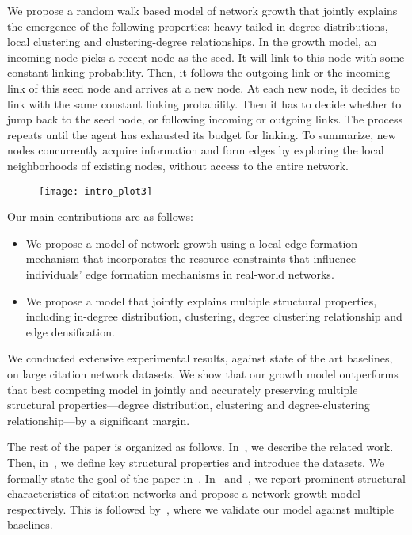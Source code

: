 We propose a random walk based model of network growth that jointly explains the
emergence of the following properties: heavy-tailed in-degree distributions,
local clustering and clustering-degree relationships. In the growth model, an
incoming node picks a recent node as the seed. It will link to this node with
some constant linking probability. Then, it follows the outgoing link or the
incoming link of this seed node and arrives at a new node. At each new node, it
decides to link with the same constant linking probability. Then it has to
decide whether to jump back to the seed node, or following incoming or outgoing
links. The process repeats until the agent has exhausted its budget for linking.
To summarize, new nodes concurrently acquire information and form edges
by exploring the local neighborhoods of existing nodes, without access to the
entire network.

\begin{figure}[t]
 \centering
 \texttt{[image: intro\_plot3]}
 \caption{
 }
 \label{fig:intro_plot}
\end{figure}


Our main contributions are as follows:
\begin{itemize}
    \item We propose a model
    of network growth using a local edge formation mechanism that incorporates the
    resource constraints that influence individuals' edge formation mechanisms in
    real-world networks.
    \item We propose a model that jointly explains multiple
    structural properties, including in-degree distribution, clustering, degree
    clustering relationship and edge densification.
\end{itemize}


We conducted extensive experimental results, against state of the art
baselines, on large citation network datasets. We show that our growth model
outperforms that best competing model in jointly and accurately preserving
multiple structural properties---degree distribution, clustering and
degree-clustering relationship---by a significant margin.

The rest of the paper is organized as follows. In~, we
describe the related work. Then, in~, we define key
structural properties and introduce the datasets. We formally state the goal of
the paper in~. In~
and~, we report prominent structural characteristics
of citation networks and propose a network growth model respectively. This is
followed by~, where we validate our model against
multiple baselines.